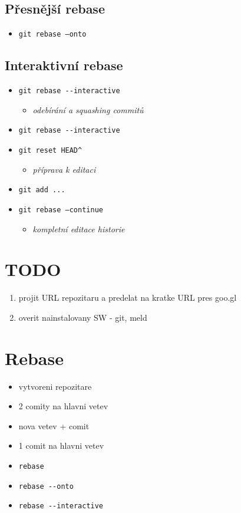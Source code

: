 \documentclass[10pt,twocolumn]{article}
\begin{document}

\subsection{Přesnější rebase}

\begin{itemize}
	\item \texttt{git rebase --onto}
\end{itemize}

\subsection{Interaktivní rebase}

\begin{itemize}
	\item \texttt{git rebase {-}{-}interactive}
	\begin{itemize} \item \textit{odebírání a squashing commitů} \end{itemize}
	\item \texttt{git rebase {-}{-}interactive}
	\item \texttt{git reset HEAD\^{ }}
	\begin{itemize} \item \textit{příprava k editaci} \end{itemize}
	\item \texttt{git add ...}
	\item \texttt{git rebase --continue}
	\begin{itemize} \item \textit{kompletní editace historie} \end{itemize}
\end{itemize}

\section{TODO}

\begin{enumerate}
	\item projit URL repozitaru a predelat na kratke URL pres goo.gl
	\item overit nainstalovany SW - git, meld
\end{enumerate}

\section{Rebase}

\begin{itemize}
	\item vytvoreni repozitare
	\item 2 comity na hlavni vetev
	\item nova vetev + comit
	\item 1 comit na hlavni vetev
	\item \texttt{rebase}
	\item \texttt{rebase {-}{-}onto}
	\item \texttt{rebase {-}{-}interactive}
\end{itemize}
\end{document}
